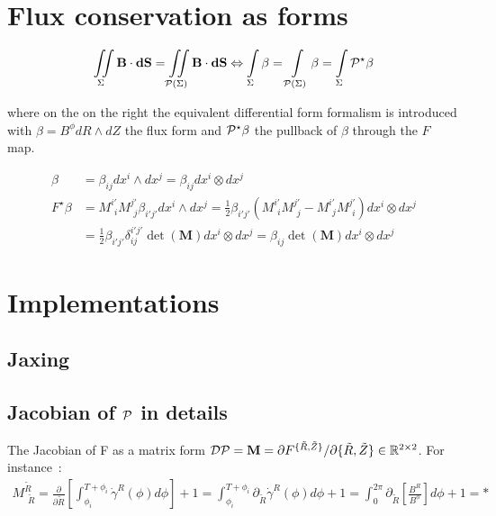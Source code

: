\chapter{Flux conservation as forms}\label{forms}

\begin{equation*}
    \iint\limits_{\Sigma}\textbf{B}\cdot\textbf{dS} = \iint\limits_{\mathcal{P}(\Sigma)}\textbf{B}\cdot\textbf{dS} \Leftrightarrow \int\limits_{\Sigma}\beta = \int\limits_{\mathcal{P}(\Sigma)}\beta = \int\limits_{\Sigma}\mathcal{P}^\star\beta
\end{equation*}

where on the on the right the equivalent differential form formalism is introduced with $\beta = B^\phi dR\wedge dZ$ the flux form and $\mathcal{P}^\star\beta$ the pullback of $\beta$ through the $F$ map.

\begin{align*}
    \beta &= \beta_{ij}dx^i\wedge dx^j = \beta_{ij}dx^i\otimes dx^j\\
    F^\star\beta &= M^{i'}_{\,\:i}M^{j'}_{\,\:j}\beta_{i'j'}dx^i\wedge dx^j = \frac{1}{2}\beta_{i'j'}\left(M^{i'}_{\,\:i}M^{j'}_{\,\:j}-M^{i'}_{\,\:j}M^{j'}_{\,\:i}\right)dx^i\otimes dx^j\\ &= \frac{1}{2}\beta_{i'j'}\delta^{i'j'}_{ij} \det(\textbf{M})dx^i\otimes dx^j = \beta_{ij}\det(\textbf{M})dx^i\otimes dx^j
\end{align*}

\chapter{Implementations}

\section{Jaxing}\label{sec:jaxpot}

\section{Jacobian of $\mathcal{P}$ in details}
The Jacobian of F as a matrix form $\mathcal{D}\mathcal{P} = \textbf{M} = \partial F^{\{\tilde{R},\tilde{Z}\}}/{\partial \{\tilde{R},\tilde{Z}\}} \in \mathbb{R}^{2\times2}$. For instance~:
\begin{align*}
    M^{\tilde{R}}_{\,\:\tilde{R}} = \frac{\partial}{\partial \tilde{R}}\left[\int_{\phi_i}^{T+\phi_i}\dot{\gamma}^R(\phi)d\phi\right] + 1 = \int_{\phi_i}^{T+\phi_i}\partial_{\tilde{R}}\dot{\gamma}^R(\phi)d\phi + 1 = \int_0^{2\pi}\partial_{\tilde{R}}\left[\frac{B^R}{B^\phi}\right]d\phi + 1 = *
\end{align*}

